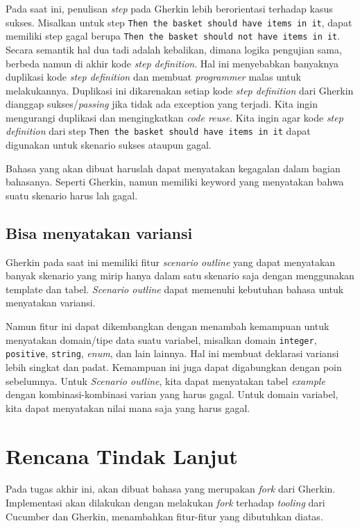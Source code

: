 Pada saat ini, penulisan \emph{step} pada Gherkin lebih berorientasi terhadap
kasus sukses. Misalkan untuk step \texttt{Then the basket should have items in it},
dapat memiliki step gagal berupa \texttt{Then the basket should not have items in it}.
Secara semantik hal dua tadi adalah kebalikan, dimana logika pengujian
sama, berbeda namun di akhir kode \emph{step definition}. Hal ini
menyebabkan banyaknya duplikasi kode \emph{step definition} dan membuat \emph{programmer} malas untuk
melakukannya.
Duplikasi ini dikarenakan setiap kode \emph{step definition} dari Gherkin dianggap
sukses/\emph{passing} jika tidak ada exception yang terjadi.
Kita ingin mengurangi duplikasi dan mengingkatkan \emph{code reuse}.
Kita ingin agar kode \emph{step definition} dari step \texttt{Then the basket should have items in it}
dapat digunakan untuk skenario sukses ataupun gagal.

Bahasa yang akan dibuat haruslah dapat menyatakan kegagalan dalam bagian bahasanya.
Seperti Gherkin, namun memiliki keyword yang menyatakan bahwa suatu skenario
harus lah gagal.

\subsection*{Bisa menyatakan variansi}

Gherkin pada saat ini memiliki fitur \emph{scenario outline} yang dapat menyatakan banyak skenario yang mirip
hanya dalam satu skenario saja dengan menggunakan template dan tabel.
\emph{Scenario outline} dapat memenuhi kebutuhan bahasa untuk menyatakan variansi. 

Namun fitur ini dapat dikembangkan dengan menambah kemampuan untuk menyatakan domain/tipe data suatu variabel, misalkan 
domain \texttt{integer}, \texttt{positive}, \texttt{string}, \emph{enum}, dan lain lainnya.
Hal ini membuat deklarasi variansi lebih singkat dan padat.
Kemampuan ini juga dapat digabungkan dengan poin sebelumnya.
Untuk \emph{Scenario outline}, kita dapat menyatakan tabel \emph{example} dengan kombinasi-kombinasi varian yang harus gagal.
Untuk domain variabel, kita dapat menyatakan nilai mana saja yang harus gagal.



\section{Rencana Tindak Lanjut}

Pada tugas akhir ini, akan dibuat bahasa yang merupakan \emph{fork} dari Gherkin.
Implementasi akan dilakukan dengan melakukan \emph{fork} terhadap \emph{tooling} dari Cucumber dan Gherkin,
menambahkan fitur-fitur yang dibutuhkan diatas.

